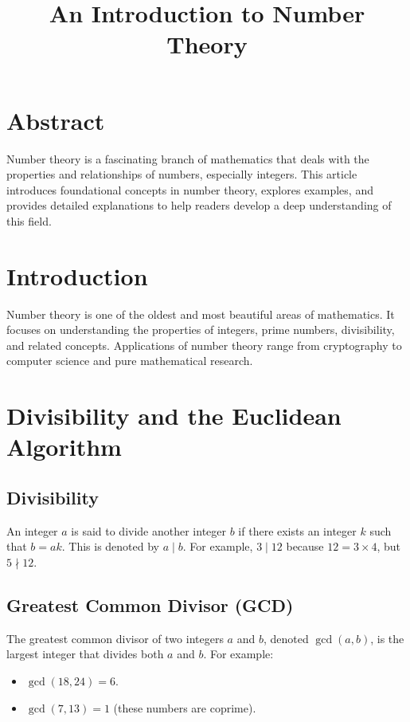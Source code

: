 \documentclass[12pt]{article}
\title{An Introduction to Number Theory}
\author{}
\date{}
\begin{document}
\maketitle

\section*{Abstract}
Number theory is a fascinating branch of mathematics that deals with the properties and relationships of numbers, especially integers. This article introduces foundational concepts in number theory, explores examples, and provides detailed explanations to help readers develop a deep understanding of this field.

\tableofcontents

\section{Introduction}
Number theory is one of the oldest and most beautiful areas of mathematics. It focuses on understanding the properties of integers, prime numbers, divisibility, and related concepts. Applications of number theory range from cryptography to computer science and pure mathematical research.

\section{Divisibility and the Euclidean Algorithm}

\subsection{Divisibility}
An integer $a$ is said to divide another integer $b$ if there exists an integer $k$ such that $b = ak$. This is denoted by $a \mid b$. For example, $3 \mid 12$ because $12 = 3 \times 4$, but $5 \nmid 12$.

\subsection{Greatest Common Divisor (GCD)}
The greatest common divisor of two integers $a$ and $b$, denoted $\gcd(a, b)$, is the largest integer that divides both $a$ and $b$. For example:
\begin{itemize}
    \item $\gcd(18, 24) = 6$.
    \item $\gcd(7, 13) = 1$ (these numbers are coprime).
\end{itemize}
\end{document}
